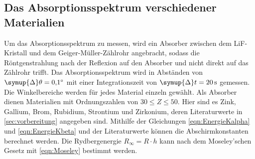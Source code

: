 \subsection{Das Absorptionsspektrum verschiedener Materialien}

    Um das Absorptionsspektrum zu messen,
    wird ein Absorber zwischen dem LiF-Kristall und dem Geiger-Müller-Zählrohr angebracht,
    sodass die Röntgenstrahlung nach der Reflexion auf den Absorber und nicht direkt auf das Zählrohr trifft.
    Das Absorptionsspektrum wird in Abständen von $\symup{\Delta}\theta = \SI{0.1}{\degree}$ mit einer Integrationszeit von $\symup{\Delta}t = \SI{20}{\second}$ gemessen.
    Die Winkelbereiche werden für jedes Material einzeln gewählt.
    Als Absorber dienen Materialien mit Ordnungszahlen von $30 \leq Z \leq 50$.
    Hier sind es Zink, Gallium, Brom, Rubidium, Strontium und Zirkonium,
    deren Literaturwerte in \autoref{sec:vorbereitung} angegeben sind.
    Mithilfe der Gleichungen \eqref{eqn:EnergieKalpha} und \eqref{eqn:EnergieKbeta} und der Literaturwerte können die Abschirmkonstanten berechnet werden.
    Die Rydbergenergie $R_\infty = R \cdot h$ kann nach dem Moseley'schen Gesetz mit \autoref{eqn:Moseley} bestimmt werden.
